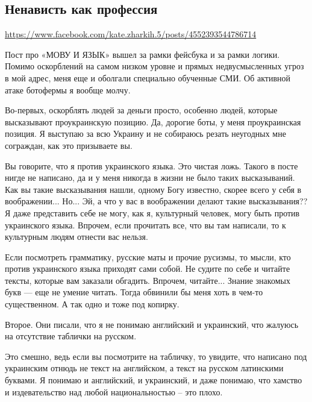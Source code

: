  
 
 
 
 

\subsection{Ненависть как профессия}
\label{sec:23_06_2020.fb.zharkih_ekaterina.1.mova_jazyk}
\url{https://www.facebook.com/kate.zharkih.5/posts/4552393544786714}

Пост про «МОВУ И ЯЗЫК» вышел за рамки фейсбука и за рамки логики. Помимо
оскорблений на самом низком уровне и прямых недвусмысленных угроз в мой адрес,
меня еще и оболгали специально обученные СМИ. Об активной атаке ботофермы я
вообще молчу.

Во-первых, оскорблять людей за деньги просто, особенно людей, которые
высказывают проукраинскую позицию. Да, дорогие боты, у меня проукраинская
позиция. Я выступаю за всю Украину и не собираюсь резать неугодных мне
сограждан, как это призываете вы.

Вы говорите, что я против украинского языка. Это чистая ложь. Такого в посте
нигде не написано, да и у меня никогда в жизни не было таких высказываний. Как
вы такие высказывания нашли, одному Богу известно, скорее всего у себя в
воображении... Но... Эй, а что у вас в воображении делают такие высказывания??
Я даже представить себе не могу, как я, культурный человек, могу быть против
украинского языка. Впрочем, если прочитать все, что вы там написали, то к
культурным людям отнести вас нельзя. 

Если посмотреть грамматику, русские маты и прочие русизмы, то мысли, кто против
украинского языка приходят сами собой. Не судите по себе и читайте тексты,
которые вам заказали обгадить. Впрочем, читайте... Знание знакомых букв — еще
не умение читать. Тогда обвинили бы меня хоть в чем-то существенном. А так одно
и тоже под копирку. 

Второе. Они писали, что я не понимаю английский и украинский, что жалуюсь на
отсутствие таблички на русском. 

Это смешно, ведь если вы посмотрите на табличку, то увидите, что написано под
украинским отнюдь не текст на английском, а текст на русском латинскими
буквами. Я понимаю и английский, и украинский, и даже понимаю, что хамство и
издевательство над любой национальностью – это плохо. 

